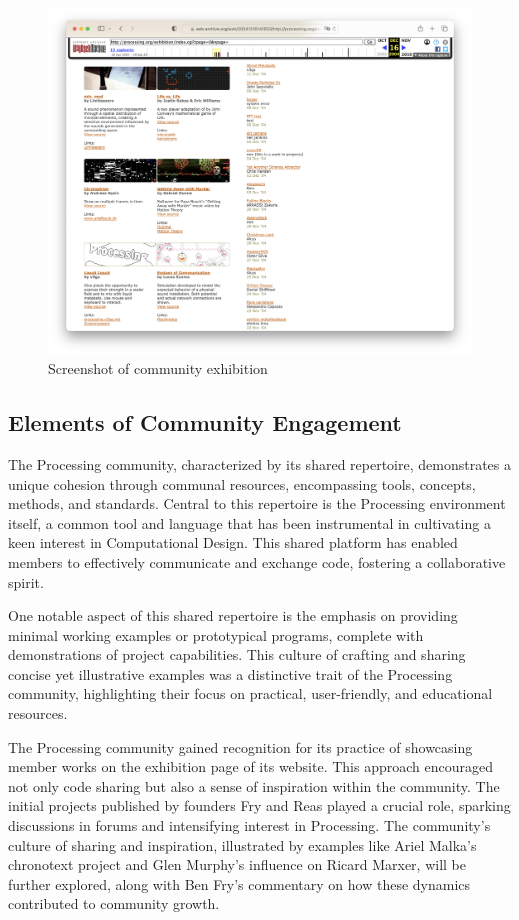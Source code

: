 \newpage
\begin{figure}
	\centering
	\includegraphics[width=1.0\textwidth]{images/exhibitions.png}
	\caption{Screenshot of community exhibition}
	\label{fig:website-exhibition}
\end{figure}

\subsection{Elements of Community Engagement}

The Processing community, characterized by its shared repertoire, demonstrates a unique cohesion through communal resources, encompassing tools, concepts, methods, and standards. Central to this repertoire is the Processing environment itself, a common tool and language that has been instrumental in cultivating a keen interest in Computational Design. This shared platform has enabled members to effectively communicate and exchange code, fostering a collaborative spirit.

One notable aspect of this shared repertoire is the emphasis on providing minimal working examples or prototypical programs, complete with demonstrations of project capabilities. This culture of crafting and sharing concise yet illustrative examples was a distinctive trait of the Processing community, highlighting their focus on practical, user-friendly, and educational resources.

The Processing community gained recognition for its practice of showcasing member works on the exhibition page of its website. This approach encouraged not only code sharing but also a sense of inspiration within the community. The initial projects published by founders Fry and Reas played a crucial role, sparking discussions in forums and intensifying interest in Processing. The community's culture of sharing and inspiration, illustrated by examples like Ariel Malka's chronotext project and Glen Murphy's influence on Ricard Marxer, will be further explored, along with Ben Fry's commentary on how these dynamics contributed to community growth.

